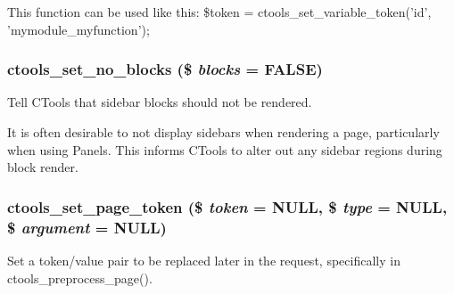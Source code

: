This function can be used like this: \$token = ctools\_\-set\_\-variable\_\-token('id', 'mymodule\_\-myfunction'); \hypertarget{ctools_8module_a03a4ac4bc4f550a72c5d661f9124c9a6}{
\subsubsection[{ctools\_\-set\_\-no\_\-blocks}]{\setlength{\rightskip}{0pt plus 5cm}ctools\_\-set\_\-no\_\-blocks (\$ {\em blocks} = {\ttfamily FALSE})}}
\label{ctools_8module_a03a4ac4bc4f550a72c5d661f9124c9a6}
Tell CTools that sidebar blocks should not be rendered.

It is often desirable to not display sidebars when rendering a page, particularly when using Panels. This informs CTools to alter out any sidebar regions during block render. \hypertarget{ctools_8module_a0a8283ac6186ae3c5f1075fd8a05dd64}{
\subsubsection[{ctools\_\-set\_\-page\_\-token}]{\setlength{\rightskip}{0pt plus 5cm}ctools\_\-set\_\-page\_\-token (\$ {\em token} = {\ttfamily NULL}, \/  \$ {\em type} = {\ttfamily NULL}, \/  \$ {\em argument} = {\ttfamily NULL})}}
\label{ctools_8module_a0a8283ac6186ae3c5f1075fd8a05dd64}
Set a token/value pair to be replaced later in the request, specifically in ctools\_\-preprocess\_\-page().


